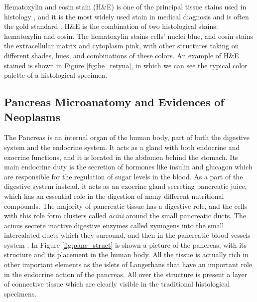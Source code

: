     Hematoxylin and eosin stain (H\&E) is one of the principal tissue stains used in histology \cite{he_stain}, and it is the most widely used stain in medical diagnosis and is often the gold standard \cite{Rosai2007}. H\&E is the combination of two histological stains: hematoxylin and eosin. The hematoxylin stains cells' nuclei blue, and eosin stains the extracellular matrix and cytoplasm pink, with other structures taking on different shades, hues, and combinations of these colors. An example of H\&E stained is shown in Figure \ref{fig:he_retyna}, in which we can see the typical color palette of a histological specimen.

\subsection{Pancreas Microanatomy and Evidences of Neoplasms} \label{ssec:pancr_anat}
    The Pancreas is an internal organ of the human body, part of both the digestive system and the endocrine system. It acts as a gland with both endocrine and exocrine functions, and it is located in the abdomen behind the stomach. Its main endocrine duty is the secretion of hormones like insulin and glucagon which are responsible for the regulation of sugar levels in the blood. As a part of the digestive system instead, it acts as an exocrine gland secreting pancreatic juice, which has an essential role in the digestion of many different nutritional compounds. The majority of pancreatic tissue has a digestive role, and the cells with this role form clusters called \textit{acini} around the small pancreatic ducts. The acinus secrete inactive digestive enzymes called zymogens into the small intercalated ducts which they surround, and then in the pancreatic blood vessels system \cite{Pancreas}. In Figure \ref{fig:panc_struct} is shown a picture of the pancreas, with its structure and its placement in the human body. All the tissue is actually rich in other important elements as the islets of Langerhans that have an important role in the endocrine action of the pancreas. All over the structure is present a layer of connective tissue which are clearly visible in the traditional histological specimens.

